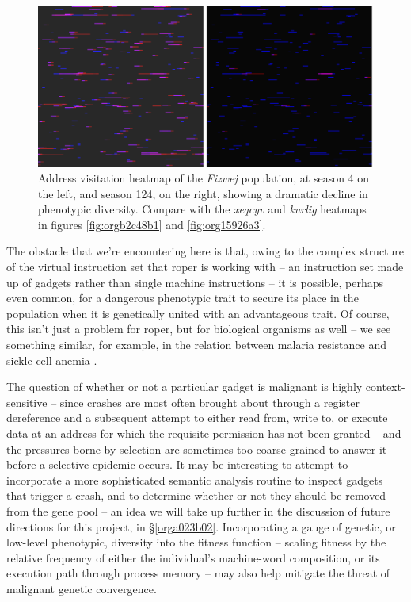 \documentclass[12pt,glossary]{dalthesis}
\begin{document}
\begin{figure}[htbp]
\centering
\includegraphics[width=.9\linewidth]{../images/plots/fizwej_S124_heatmap.pdf}
\caption{\label{fig:org08adf0e}
Address visitation heatmap of the \emph{Fizwej} population, at season 4 on the left, and season 124, on the right, showing a dramatic decline in phenotypic diversity. Compare with the \emph{xeqcyv} and \emph{kurlig} heatmaps in figures \ref{fig:orgb2c48b1} and \ref{fig:org15926a3}.}
\end{figure}

The obstacle that we're encountering here is that, owing to the complex structure
of the virtual instruction set that \gls{roper} is working with -- an instruction set
made up of gadgets rather than single machine instructions -- it is possible, perhaps
even common, for a dangerous phenotypic trait to secure its place in the population
when it is genetically united with an advantageous trait. Of course, this isn't just
a problem for \gls{roper}, but for biological organisms as well -- we see something
similar, for example, in the relation between malaria resistance and sickle cell
anemia \cite{haldane49}.

The question of whether or not a particular gadget is malignant is highly
context-sensitive -- since crashes are most often brought about through a
register dereference and a subsequent attempt to either read from, write to, or
execute data at an address for which the requisite permission has not been
granted -- and the pressures borne by selection are sometimes too coarse-grained
to answer it before a selective epidemic occurs. It may be interesting to
attempt to incorporate a more sophisticated semantic analysis routine to inspect
gadgets that trigger a crash, and to determine whether or not they should be
removed from the gene pool -- an idea we will take up further in the discussion
of future directions for this project, in \S \ref{orga023b02}. Incorporating
a gauge of genetic, or low-level phenotypic, diversity into the fitness function
-- scaling fitness by the relative frequency of either the individual's
machine-word composition, or its execution path through process memory -- may
also help mitigate the threat of malignant genetic convergence.
\end{document}
